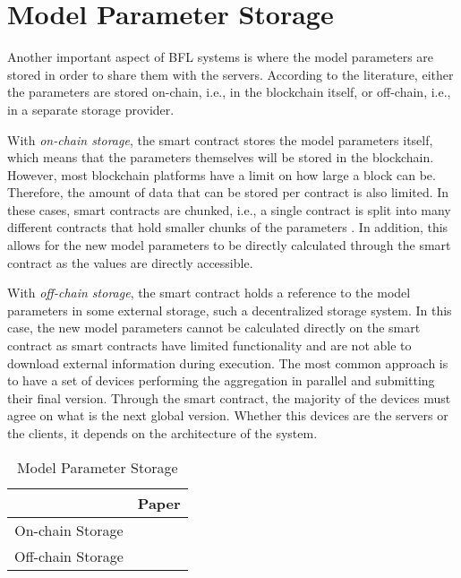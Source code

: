\section{Model Parameter Storage}\label{related_work:param_storage}

Another important aspect of BFL systems is where the model parameters are stored in order to share them with the servers. According to the literature, either the parameters are stored on-chain, i.e., in the blockchain itself, or off-chain, i.e., in a separate storage provider.

With \textit{on-chain storage}, the smart contract stores the model parameters itself, which means that the parameters themselves will be stored in the blockchain. However, most blockchain platforms have a limit on how large a block can be. Therefore, the amount of data that can be stored per contract is also limited. In these cases, smart contracts are chunked, i.e., a single contract is split into many different contracts that hold smaller chunks of the parameters \cite{9274451, baffle}. In addition, this allows for the new model parameters to be directly calculated through the smart contract as the values are directly accessible.
    
With \textit{off-chain storage}, the smart contract holds a reference to the model parameters in some external storage, such a decentralized storage system. In this case, the new model parameters cannot be calculated directly on the smart contract as smart contracts have limited functionality and are not able to download external information during execution. The most common approach is to have a set of devices performing the aggregation in parallel and submitting their final version. Through the smart contract, the majority of the devices must agree on what is the next global version. Whether this devices are the servers or the clients, it depends on the architecture of the system.

\begin{table}[!b]
\begin{tabular}{c|c} \hline \hline
                  & Paper \\ \hline \hline
On-chain Storage  & \cite{9274451, baffle, demo, 8733825, 9524833, 8894364, 9184854, 8893114}\\ \hline
Off-chain Storage & \cite{10.1145/3319535.3363256, 10.48550/arxiv.2011.07516, 8945913, 10.48550/arxiv.2202.02817, 10.48550/arxiv.2007.03856, 10.48550/arxiv.1910.12603, Peyvandi2022, 9170559} \\      \hline
\end{tabular}
\caption{Model Parameter Storage}\label{tab:storage}
\end{table}

